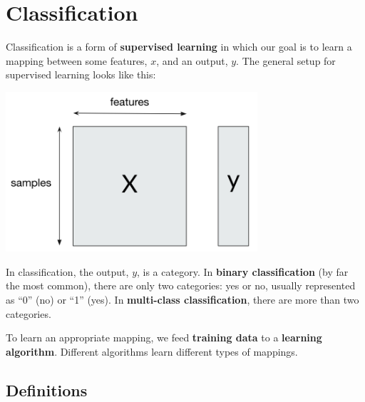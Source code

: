 \chapter{Classification \label{chapter:classification}}

Classification is a form of \textbf{supervised learning} in which our goal is to learn a mapping between some features, $x$, and an output, $y$. The general setup for supervised learning looks like this:
\begin{center}
\includegraphics[width=0.7\textwidth]{img/supervised-learning.png}
\end{center}

In classification, the output, $y$, is a category. In \textbf{binary classification} (by far the most common), there are only two categories: yes or no, usually represented as ``0'' (no) or ``1'' (yes). In \textbf{multi-class classification}, there are more than two categories.

To learn an appropriate mapping, we feed \textbf{training data} to a \textbf{learning algorithm}. Different algorithms learn different types of mappings.

\section{Definitions}

